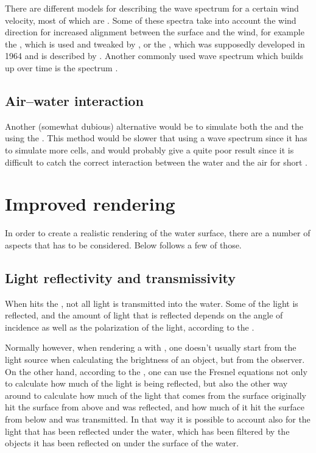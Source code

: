 There are different models for describing the wave spectrum for a certain wind velocity, most of which are \empirical. Some of these spectra take into account the wind direction for increased alignment between the surface and the wind, for example the , which is used and tweaked by \citet{Tessendorf2001}, or the , which was supposedly developed in 1964 and is described by \citet{Premovze2001}. Another commonly used wave spectrum which builds up over time is the \JONSWAP spectrum \citep{Journee2001b,WikiWaves2013}.

\subsection{Air--water interaction}

Another (somewhat dubious) alternative would be to simulate both the \water and the \air using the \FVM. This method would be slower that using a wave spectrum since it has to simulate more cells, and would probably give a quite poor result since it is difficult to catch the correct interaction between the water and the air for short \wavelengths.

\section{Improved rendering}

In order to create a realistic rendering of the water surface, there are a number of aspects that has to be considered. Below follows a few of those.

\subsection{Light reflectivity and transmissivity}

When \light hits the , not all light is transmitted into the water. Some of the light is reflected, and the amount of light that is reflected depends on the angle of incidence as well as the polarization of the light, according to the .

Normally however, when rendering a \scene with , one doesn't usually start from the light source when calculating the brightness of an object, but from the observer. On the other hand, according to the , one can use the Fresnel equations not only to calculate how much of the light is being reflected, but also the other way around to calculate how much of the light that comes from the surface originally hit the surface from above and was reflected, and how much of it hit the surface from below and was transmitted. In that way it is possible to account also for the light that has been reflected under the water, which has been filtered by the objects it has been reflected on under the surface of the water.

